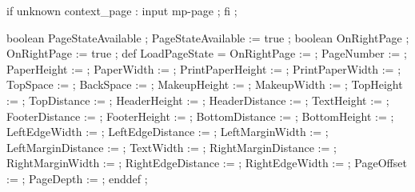 


\unprotect 

\appendtoks 
  if unknown context_page : input mp-page ; fi ; 
\to \MPinitializations 


  boolean PageStateAvailable ; PageStateAvailable := true ; 
  boolean OnRightPage        ; OnRightPage        := true ;  
  def LoadPageState = 
    OnRightPage         :=      \MPonrightpage ; 
    PageNumber          :=      \realfolio ; 
    PaperHeight         :=  \the\papierhoogte ;
    PaperWidth          :=  \the\papierbreedte ;
    PrintPaperHeight    :=  \the\printpapierhoogte ;
    PrintPaperWidth     :=  \the\printpapierbreedte ;
    TopSpace            :=  \the\kopwit ;
    BackSpace           :=  \the\rugwit ;
    MakeupHeight        :=  \the\zethoogte ;
    MakeupWidth         :=  \the\zetbreedte ;
    TopHeight           :=  \the\bovenhoogte ;
    TopDistance         := \@the\bovenafstand ;
    HeaderHeight        :=  \the\hoofdhoogte ;
    HeaderDistance      := \@the\hoofdafstand ;
    TextHeight          :=  \the\teksthoogte ;
    FooterDistance      := \@the\voetafstand ;
    FooterHeight        :=  \the\voethoogte ;
    BottomDistance      := \@the\onderafstand ;
    BottomHeight        :=  \the\onderhoogte ;
    LeftEdgeWidth       :=  \the\linkerrandbreedte ;
    LeftEdgeDistance    := \@the\linkerrandafstand ;
    LeftMarginWidth     :=  \the\linkermargebreedte ;
    LeftMarginDistance  := \@the\linkermargeafstand ;
    TextWidth           :=  \the\tekstbreedte ;
    RightMarginDistance := \@the\rechtermargeafstand ;
    RightMarginWidth    :=  \the\rechtermargebreedte ;
    RightEdgeDistance   := \@the\rechterrandafstand ;
    RightEdgeWidth      :=  \the\rechterrandbreedte ;
    PageOffset          :=      \MPpageoffset ;
    PageDepth           :=      \MPpagedepth ;
  enddef ; 
\stopuseMPgraphic
              

